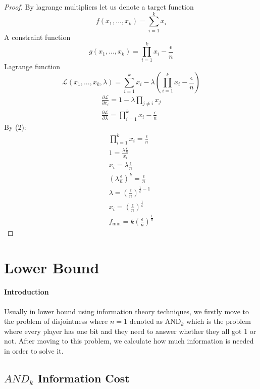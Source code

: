 \documentclass{article}
\theoremstyle{plain}
\begin{document}
\begin{proof}
By lagrange multipliers let us denote a target function 
\begin{equation*}
    f(x_1, ... , x_k) = \sum_{i=1}^{k}x_i
\end{equation*}
A constraint function
\begin{equation*}
    g(x_1, ... , x_k) = \prod_{i=1}^{k}x_i - \frac{\epsilon}{n} 
\end{equation*}
Lagrange function
\begin{equation*}
    \mathcal{L}(x_1, ... , x_k, \lambda) = \sum_{i=1}^{k}x_i - \lambda\left(\prod_{i=1}^{k}x_i - \frac{\epsilon}{n}  \right)
\end{equation*}
\begin{align*}
    \frac{\partial\mathcal{L}}{\partial x_i} = 1 - \lambda\prod_{j \neq i}x_j  \\
    \frac{\partial\mathcal{L}}{\partial \lambda} = \prod_{i=1}^{k}x_i - \frac{\epsilon}{n}
\end{align*}
By (2):
\begin{align*}
    \prod_{i=1}^{k}x_i = \frac{\epsilon}{n} \\
    1 = \frac{\lambda\frac{\epsilon}{n}}{x_i} \\ 
    x_i = \lambda\frac{\epsilon}{n} \\
    \left(\lambda\frac{\epsilon}{n}\right)^k = \frac{\epsilon}{n} \\
    \lambda = \left(\frac{\epsilon}{n}\right)^{\frac{1}{k} - 1} \\
    x_i = \left(\frac{\epsilon}{n}\right)^{\frac{1}{k}} \\
    f_{\text{min}} = k\left(\frac{\epsilon}{n}\right)^{\frac{1}{k}}
\end{align*}
\end{proof}
\section{Lower Bound}
\paragraph{Introduction}
Usually in lower bound using information theory techniques, we firstly move to the problem of disjointness where $n=1$ denoted as $\text{AND}_k$ which is the problem where every player has one bit and they need to answer whether they all got 1 or not. After moving to this problem, we calculate how much information is needed in order to solve it.
\subsection{$AND_k$ Information Cost}
\end{document}
